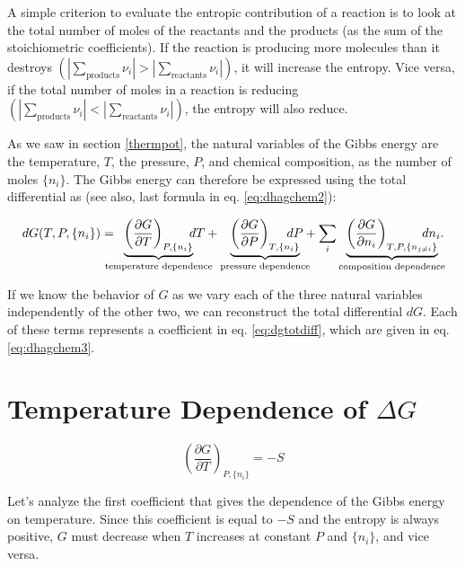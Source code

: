 \documentclass[
  9pt,
]{extbook}
\theoremstyle{definition}
\theoremstyle{definition}
\theoremstyle{definition}
\theoremstyle{definition}
\theoremstyle{remark}
\begin{document}
A simple criterion to evaluate the entropic contribution of a reaction is to look at the total number of moles of the reactants and the products (as the sum of the stoichiometric coefficients). If the reaction is producing more molecules than it destroys \(\left( \left| \sum_\text{products} \nu_i \right| > \left| \sum_\text{reactants} \nu_i \right| \right)\), it will increase the entropy. Vice versa, if the total number of moles in a reaction is reducing \(\left( \left| \sum_\text{products} \nu_i \right| < \left| \sum_\text{reactants} \nu_i \right| \right)\), the entropy will also reduce.

As we saw in section \ref{thermpot}, the natural variables of the Gibbs energy are the temperature, \(T\), the pressure, \(P\), and chemical composition, as the number of moles \(\{n_i\}\). The Gibbs energy can therefore be expressed using the total differential as (see also, last formula in eq. \eqref{eq:dhagchem2}):

\begin{equation}
dG(T,P,\{n_i\}) = \mkern-18mu \underbrace{\left(\frac{\partial G}{\partial T} \right)_{P,\{n_i\}}}_{\text{temperature dependence}} \mkern-36mu dT + \underbrace{\left(\frac{\partial G}{\partial P} \right)_{T,\{n_i\}}}_{\text{pressure dependence}} \mkern-36mu dP + \sum_i \underbrace{\left(\frac{\partial G}{\partial n_i} \right)_{T,P,\{n_{j \neq i}\}}}_{\text{composition dependence}} \mkern-36mu dn_i.
\label{eq:dgtotdiff}
\end{equation}

If we know the behavior of \(G\) as we vary each of the three natural variables independently of the other two, we can reconstruct the total differential \(dG\). Each of these terms represents a coefficient in eq. \eqref{eq:dgtotdiff}, which are given in eq. \eqref{eq:dhagchem3}.

\section{\texorpdfstring{Temperature Dependence of \(\Delta G\)}{Temperature Dependence of \textbackslash Delta G}}\label{temperature-dependence-of-delta-g}

\[\left(\frac{\partial G}{\partial T} \right)_{P,\{n_i\}}=-S\]

Let's analyze the first coefficient that gives the dependence of the Gibbs energy on temperature. Since this coefficient is equal to \(-S\) and the entropy is always positive, \(G\) must decrease when \(T\) increases at constant \(P\) and \(\{n_i\}\), and vice versa.
\end{document}
